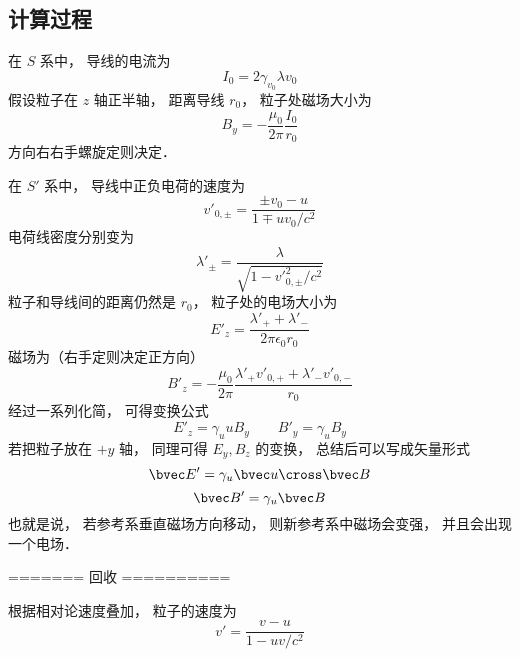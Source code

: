 \subsection{计算过程}
在 $S$ 系中， 导线的电流为
\begin{equation}
I_0 = 2 \gamma_{v_0}\lambda v_0
\end{equation}
假设粒子在 $z$ 轴正半轴， 距离导线 $r_0$， 粒子处磁场大小为
\begin{equation}
B_y = -\frac{\mu_0}{2\pi} \frac{I_0}{r_0}
\end{equation}
方向右右手螺旋定则决定．

在 $S'$ 系中， 导线中正负电荷的速度为
\begin{equation}
v'_{0, \pm} = \frac{\pm v_0-u}{1 \mp uv_0/c^2}
\end{equation}
电荷线密度分别变为
\begin{equation}
\lambda'_\pm = \frac{\lambda}{\sqrt{1 - v'^2_{0,\pm}/c^2}}
\end{equation}
粒子和导线间的距离仍然是 $r_0$， 粒子处的电场大小为
\begin{equation}
E'_z = \frac{\lambda'_+ + \lambda'_-}{2 \pi \epsilon_{0} r_0}
\end{equation}
磁场为（右手定则决定正方向）
\begin{equation}
B'_z = -\frac{\mu_0}{2\pi} \frac{\lambda'_+ v'_{0,+} + \lambda'_- v'_{0,-}}{r_0}
\end{equation}
经过一系列化简， 可得变换公式
\begin{equation}
E'_z = \gamma_u u B_y
\qquad
B'_y = \gamma_u B_y
\end{equation}
若把粒子放在 $+y$ 轴， 同理可得 $E_y, B_z$ 的变换， 总结后可以写成矢量形式
\begin{equation}
\bvec E' = \gamma_u \bvec u \cross \bvec B
\end{equation}
\begin{equation}
\bvec B' = \gamma_u \bvec B
\end{equation}
也就是说， 若参考系垂直磁场方向移动， 则新参考系中磁场会变强， 并且会出现一个电场．




======= 回收 ==========

根据相对论速度叠加， 粒子的速度为
\begin{equation}
v' = \frac{v - u}{1 - uv/c^2}
\end{equation}
